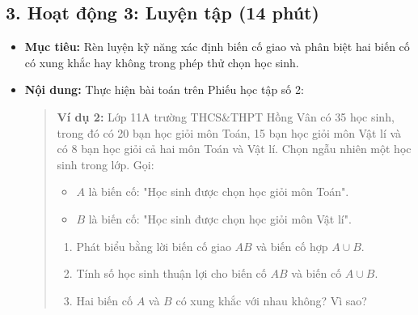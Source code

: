 \documentclass[12pt, a4paper]{article}
\begin{document}
\subsection*{3. Hoạt động 3: Luyện tập (14 phút)}

\begin{itemize}[leftmargin=1.2cm]
    \item[a)] \textbf{Mục tiêu:} Rèn luyện kỹ năng xác định biến cố giao và phân biệt hai biến cố có xung khắc hay không trong phép thử chọn học sinh.
    \item[b)] \textbf{Nội dung:} Thực hiện bài toán trên Phiếu học tập số 2:
    \begin{quote}
        \textbf{Ví dụ 2:} Lớp 11A trường THCS\&THPT Hồng Vân có 35 học sinh, trong đó có 20 bạn học giỏi môn Toán, 15 bạn học giỏi môn Vật lí và có 8 bạn học giỏi cả hai môn Toán và Vật lí. Chọn ngẫu nhiên một học sinh trong lớp. Gọi:
        \begin{itemize}
            \item $A$ là biến cố: "Học sinh được chọn học giỏi môn Toán".
            \item $B$ là biến cố: "Học sinh được chọn học giỏi môn Vật lí".
        \end{itemize}
        \begin{enumerate}
            \item Phát biểu bằng lời biến cố giao $AB$ và biến cố hợp $A \cup B$.
            \item Tính số học sinh thuận lợi cho biến cố $AB$ và biến cố $A \cup B$.
            \item Hai biến cố $A$ và $B$ có xung khắc với nhau không? Vì sao?
        \end{enumerate}
    \end{quote}


\end{itemize}
\end{document}
